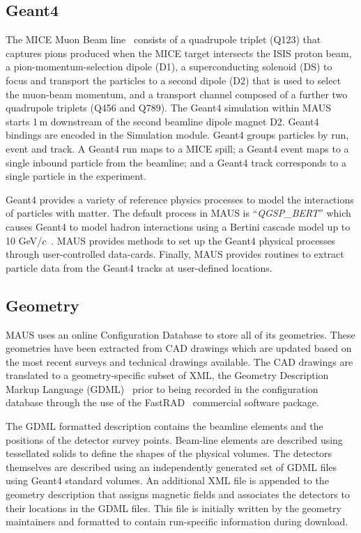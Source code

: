 \documentclass[11pt]{article}
\begin{document}
\subsection{Geant4}\label{sec:geant}
The MICE Muon Beam line~\cite{BeamlineJINST} consists of a quadrupole triplet (Q123) that captures pions produced when the MICE target intersects the ISIS proton beam, a pion-momentum-selection dipole (D1), a superconducting solenoid (DS) to focus and transport the particles to a second dipole (D2) that is used to select the muon-beam momentum, and a transport channel composed of a further two quadrupole triplets (Q456 and Q789). The Geant4 simulation within MAUS starts 1\,m downstream of the second beamline dipole magnet D2. Geant4 bindings are encoded in the Simulation module. Geant4 groups particles by run, event and track. A Geant4 run maps to a MICE spill; a Geant4 event maps to a single inbound particle from the beamline; and a Geant4 track corresponds to a single particle in the experiment.

Geant4 provides a variety of reference physics processes to model the interactions of particles with matter. The default process in MAUS is ``\emph{QGSP\_BERT}'' which causes Geant4 to model hadron interactions using a Bertini cascade model up to 10 GeV/$c$~\cite{GEANT4HPhysics}. MAUS provides methods to set up the Geant4 physical processes through user-controlled data-cards. Finally, MAUS provides routines to extract particle data from the Geant4 tracks at user-defined locations.

\subsection{Geometry}\label{sec:geo}

MAUS uses an online Configuration Database to store all of its
geometries. These geometries have been extracted from CAD drawings
which are  updated based on the most recent surveys and technical drawings
available. The CAD drawings are translated to a geometry-specific
subset of XML, the Geometry Description Markup Language (GDML)~\cite{GDML} prior
to being recorded in the configuration database through the use of the 
FastRAD~\cite{fastrad} commercial software package. 

The GDML formatted description contains the beamline elements and the positions of
the detector survey points. Beam-line elements are described using 
tessellated solids to define the shapes of the physical
volumes. The detectors themselves are described using an independently
generated set of GDML files using Geant4 standard volumes. An
additional XML file is appended to the geometry description that
assigns magnetic fields and associates the detectors to their
locations in the GDML files. This file is
initially written by the geometry maintainers and formatted to contain
run-specific information during download.
\end{document}

